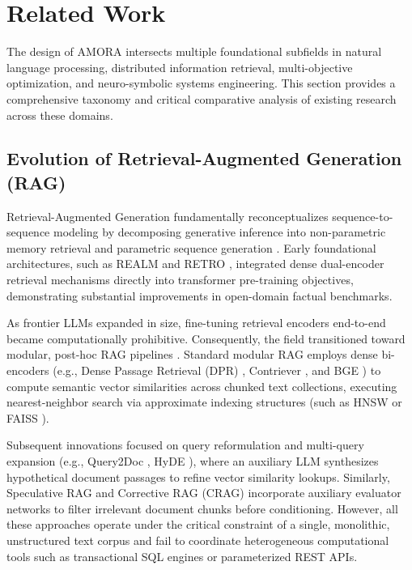 \section{Related Work}
\label{sec:related_work}

The design of AMORA intersects multiple foundational subfields in natural language processing, distributed information retrieval, multi-objective optimization, and neuro-symbolic systems engineering. This section provides a comprehensive taxonomy and critical comparative analysis of existing research across these domains.

\subsection{Evolution of Retrieval-Augmented Generation (RAG)}
Retrieval-Augmented Generation fundamentally reconceptualizes sequence-to-sequence modeling by decomposing generative inference into non-parametric memory retrieval and parametric sequence generation \cite{lewis2020rag}. Early foundational architectures, such as REALM \cite{guu2020realm} and RETRO \cite{borgeaud2022retro}, integrated dense dual-encoder retrieval mechanisms directly into transformer pre-training objectives, demonstrating substantial improvements in open-domain factual benchmarks.

As frontier LLMs expanded in size, fine-tuning retrieval encoders end-to-end became computationally prohibitive. Consequently, the field transitioned toward modular, post-hoc RAG pipelines \cite{gao2023rag_survey}. Standard modular RAG employs dense bi-encoders (e.g., Dense Passage Retrieval (DPR) \cite{karpukhin2020dpr}, Contriever \cite{izacard2021contriever}, and BGE \cite{xiao2023bge}) to compute semantic vector similarities across chunked text collections, executing nearest-neighbor search via approximate indexing structures (such as HNSW \cite{malkov2018hnsw} or FAISS \cite{johnson2019billion}). 

Subsequent innovations focused on query reformulation and multi-query expansion (e.g., Query2Doc \cite{wang2023query2doc}, HyDE \cite{gao2022hyde}), where an auxiliary LLM synthesizes hypothetical document passages to refine vector similarity lookups. Similarly, Speculative RAG \cite{wang2024speculative} and Corrective RAG (CRAG) \cite{yan2024crag} incorporate auxiliary evaluator networks to filter irrelevant document chunks before conditioning. However, all these approaches operate under the critical constraint of a single, monolithic, unstructured text corpus and fail to coordinate heterogeneous computational tools such as transactional SQL engines or parameterized REST APIs.


